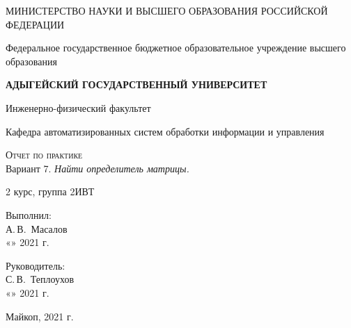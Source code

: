 \documentclass[12pt,a4paper]{scrartcl}
\begin{document}
	\begin{titlepage}
		\begin{center}
			\large
			МИНИСТЕРСТВО НАУКИ И ВЫСШЕГО ОБРАЗОВАНИЯ РОССИЙСКОЙ ФЕДЕРАЦИИ
			
			Федеральное государственное бюджетное образовательное учреждение высшего образования
			
			\textbf{АДЫГЕЙСКИЙ ГОСУДАРСТВЕННЫЙ УНИВЕРСИТЕТ}
			\vspace{0.25cm}
			
			Инженерно-физический факультет
			
			Кафедра автоматизированных систем обработки информации и управления
			\vfill

			\vfill
			
			\textsc{Отчет по практике}\\[5mm]
			
			{\LARGE Вариант 7. \textit{Найти определитель матрицы.}}
			\bigskip
			
			2 курс, группа 2ИВТ
		\end{center}
		\vfill
		
		\newlength{\ML}
		\hfill\begin{minipage}{0.5\textwidth}
			Выполнил:\\
			\underline{\hspace{\ML}} А.\,В.~Масалов\\
			«\underline{\hspace{0.7cm}}» \underline{\hspace{2cm}} 2021 г.
		\end{minipage}%
		\bigskip
		
		\hfill\begin{minipage}{0.5\textwidth}
			Руководитель:\\
			\underline{\hspace{\ML}} С.\,В.~Теплоухов\\
			«\underline{\hspace{0.7cm}}» \underline{\hspace{2cm}} 2021 г.
		\end{minipage}%
		\vfill
		
		\begin{center}
			Майкоп, 2021 г.
		\end{center}
	\end{titlepage}

\end{document}
